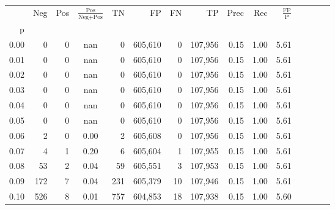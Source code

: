 \begin{tabular}{rrrcrrrrrrrrrrr}
\toprule
{} &     Neg &    Pos & $\frac{\text{Pos}}{\text{Neg}+\text{Pos}}$ &       TN &       FP &       FN &       TP &  Prec &   Rec & $\frac{\text{FP}}{\text{P}}$ \\
p    &         &        &                                            &          &          &          &          &       &       &                              \\
\midrule
0.00 &       0 &      0 &                                        nan &        0 &  605,610 &        0 &  107,956 &  0.15 &  1.00 &                         5.61 \\
0.01 &       0 &      0 &                                        nan &        0 &  605,610 &        0 &  107,956 &  0.15 &  1.00 &                         5.61 \\
0.02 &       0 &      0 &                                        nan &        0 &  605,610 &        0 &  107,956 &  0.15 &  1.00 &                         5.61 \\
0.03 &       0 &      0 &                                        nan &        0 &  605,610 &        0 &  107,956 &  0.15 &  1.00 &                         5.61 \\
0.04 &       0 &      0 &                                        nan &        0 &  605,610 &        0 &  107,956 &  0.15 &  1.00 &                         5.61 \\
0.05 &       0 &      0 &                                        nan &        0 &  605,610 &        0 &  107,956 &  0.15 &  1.00 &                         5.61 \\
0.06 &       2 &      0 &                                       0.00 &        2 &  605,608 &        0 &  107,956 &  0.15 &  1.00 &                         5.61 \\
0.07 &       4 &      1 &                                       0.20 &        6 &  605,604 &        1 &  107,955 &  0.15 &  1.00 &                         5.61 \\
0.08 &      53 &      2 &                                       0.04 &       59 &  605,551 &        3 &  107,953 &  0.15 &  1.00 &                         5.61 \\
0.09 &     172 &      7 &                                       0.04 &      231 &  605,379 &       10 &  107,946 &  0.15 &  1.00 &                         5.61 \\
0.10 &     526 &      8 &                                       0.01 &      757 &  604,853 &       18 &  107,938 &  0.15 &  1.00 &                         5.60 \\

\end{tabular}
